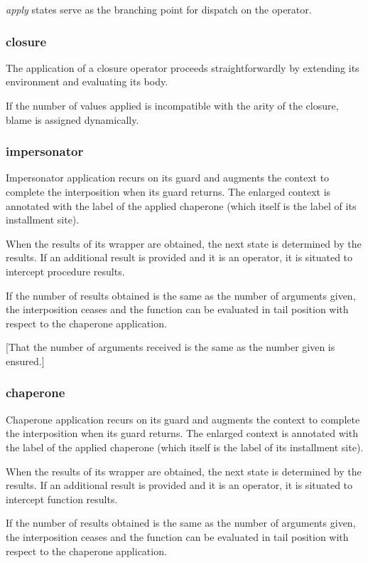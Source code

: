 \emph{apply} states serve as the branching point for dispatch on the operator.

\subsubsection{closure}

The application of a closure operator proceeds straightforwardly by extending its environment and evaluating its body.

If the number of values applied is incompatible with the arity of the closure, blame is assigned dynamically.

\subsubsection{impersonator}

Impersonator application recurs on its guard and augments the context to complete the interposition when its guard returns.
The enlarged context is annotated with the label of the applied chaperone (which itself is the label of its installment site).

When the results of its wrapper are obtained, the next state is determined by the results.
If an additional result is provided and it is an operator, it is situated to intercept procedure results.

If the number of results obtained is the same as the number of arguments given, the interposition ceases and the function can be evaluated in tail position with respect to the chaperone application.

[That the number of arguments received is the same as the number given is ensured.]



\subsubsection{chaperone}

Chaperone application recurs on its guard and augments the context to complete the interposition when its guard returns.
The enlarged context is annotated with the label of the applied chaperone (which itself is the label of its installment site).

When the results of its wrapper are obtained, the next state is determined by the results.
If an additional result is provided and it is an operator, it is situated to intercept function results.

If the number of results obtained is the same as the number of arguments given, the interposition ceases and the function can be evaluated in tail position with respect to the chaperone application.

